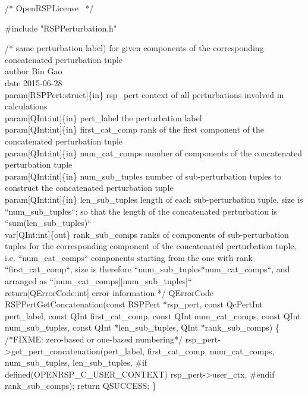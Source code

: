 \nwendcode{}\endmoddef
/*
  \LA{}OpenRSPLicense~{\nwtagstyle{}}\RA{}
*/

#include "RSPPerturbation.h"

/*%
        same perturbation label) for given components of the corresponding
        concatenated perturbation tuple
    \\author Bin Gao
    \\date 2015-06-28
    \\param[RSPPert:struct]\{in\} rsp_pert context of all perturbations involved
        in calculations
    \\param[QInt:int]\{in\} pert_label the perturbation label
    \\param[QInt:int]\{in\} first_cat_comp rank of the first component of the
        concatenated perturbation tuple
    \\param[QInt:int]\{in\} num_cat_comps number of components of the concatenated
        perturbation tuple
    \\param[QInt:int]\{in\} num_sub_tuples number of sub-perturbation tuples to
        construct the concatenated perturbation tuple
    \\param[QInt:int]\{in\} len_sub_tuples length of each sub-perturbation tuple,
        size is ``num_sub_tuples``; so that the length of the concatenated
        perturbation is ``sum(len_sub_tuples)``
    \\var[QInt:int]\{out\} rank_sub_comps ranks of components of sub-perturbation
        tuples for the corresponding component of the concatenated perturbation
        tuple, i.e. ``num_cat_comps`` components starting from the one with rank
        ``first_cat_comp``, size is therefore ``num_sub_tuples*num_cat_comps``,
        and arranged as ``[num_cat_comps][num_sub_tuples]``
    \\return[QErrorCode:int] error information
*/
QErrorCode RSPPertGetConcatenation(const RSPPert *rsp_pert,
                                   const QcPertInt pert_label,
                                   const QInt first_cat_comp,
                                   const QInt num_cat_comps,
                                   const QInt num_sub_tuples,
                                   const QInt *len_sub_tuples,
                                   QInt *rank_sub_comps)
\{
/*FIXME: zero-based or one-based numbering*/
    rsp_pert->get_pert_concatenation(pert_label,
                                     first_cat_comp,
                                     num_cat_comps,
                                     num_sub_tuples,
                                     len_sub_tuples,
#if defined(OPENRSP_C_USER_CONTEXT)
                                     rsp_pert->user_ctx,
#endif
                                     rank_sub_comps);
    return QSUCCESS;
\}

